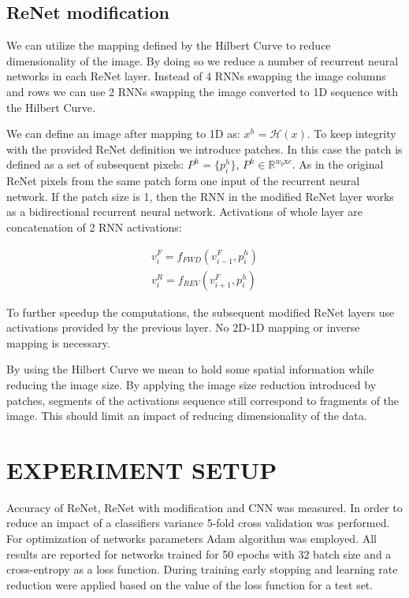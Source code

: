 \documentclass[a4paper, 10 pt, journal]{ieeeconf}
\begin{document}
\subsection{ReNet modification}

We can utilize the mapping defined by the Hilbert Curve to reduce dimensionality of the image. By doing so we reduce a number of recurrent neural networks in each ReNet layer. Instead of 4 RNNs swapping the image columns and rows we can use 2 RNNs swapping the image converted to 1D sequence with the Hilbert Curve.

We can define an image after mapping to 1D as: $x^{h} = \mathcal{H}(x)$. To keep integrity with the provided ReNet definition we introduce patches. In this case the patch is defined as a set of subsequent pixels: $P^{h} = \{ p_{i}^h \}$, $P^{h} \in \mathbb{R}^{w_p \textrm{x} c}$. As in the original ReNet pixels from the same patch form one input of the recurrent neural network. If the patch size is 1, then the RNN in the modified ReNet layer works as a bidirectional recurrent neural network. Activations of whole layer are concatenation of 2 RNN activations:

\begin{gather}
	v_{i}^{F} = f_{FWD}(v_{i-1}^{F}, p_{i}^{h}) \\
	v_{i}^{R} = f_{REV}(v_{i+1}^{F}, p_{i}^{h})
\end{gather}

To further speedup the computations, the subsequent modified ReNet layers use activations provided by the previous layer. No 2D-1D mapping or inverse mapping is necessary.

By using the Hilbert Curve we mean to hold some spatial information while reducing the image size. By applying the image size reduction introduced by patches, segments of the activations sequence still correspond to fragments of the image. This should limit an impact of reducing dimensionality of the data.

\section{EXPERIMENT SETUP}

Accuracy of ReNet, ReNet with modification and CNN was measured. In order to reduce an impact of a classifiers variance 5-fold cross validation was performed. For optimization of networks parameters Adam algorithm was employed. All results are reported for networks trained for 50 epochs with 32 batch size and a cross-entropy as a loss function. During training early stopping and  learning rate reduction were applied based on the value of the loss function for a test set.
\end{document}
